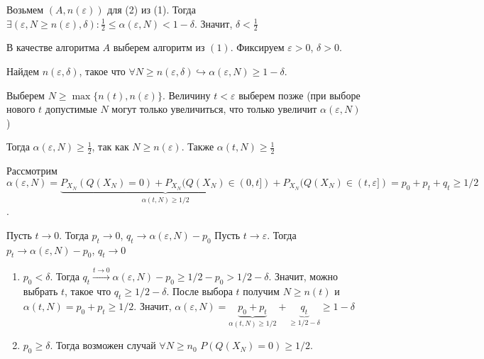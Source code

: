 \documentclass[a4paper]{article}
\def\eps{\varepsilon}
\begin{document}
\begin{enumerate}
Возьмем $(A,n(\eps))$ для (2) из (1). Тогда
$\exists(\eps,N\geqslant n(\eps),\delta)\colon \frac{1}{2}\leqslant\alpha(\eps, N)<1-\delta$. Значит, $\delta<\frac{1}{2}$

В качестве алгоритма $A$ выберем алгоритм из $(1)$. Фиксируем $\eps>0$, $\delta>0$.

Найдем $n(\eps,\delta)$, такое что $\forall N\geqslant n(\eps,\delta)\hookrightarrow\alpha(\eps, N)\geqslant 1-\delta$.

Выберем $N\geqslant \max\{n(t), n(\eps)\}$. Величину $t<\eps$ выберем позже (при выборе нового $t$ допустимые $N$ могут только увеличиться, что только увеличит $\alpha(\eps, N)$)

Тогда $\alpha(\eps, N)\geqslant\frac{1}{2}$, так как $N\geqslant n(\eps)$. Также $\alpha(t,N)\geqslant \frac{1}{2}$

Рассмотрим $\alpha(\eps, N)=\underbrace{P_{X_N}(Q(X_N)=0)+P_{X_N}(Q(X_N)\in(0,t])}_{\alpha(t,N)\geqslant1/2}+P_{X_N}(Q(X_N)\in(t,\eps])=p_0+p_t+q_t\geqslant 1/2$.

Пусть $t\to 0$. Тогда $p_t\to 0$, $q_t\to\alpha(\eps, N)-p_0$
Пусть $t\to\eps$. Тогда $p_t\to \alpha(\eps, N)-p_0$, $q_t\to 0$

\begin{enumerate}
\item $p_0<\delta$. Тогда $q_t\overset{t\to 0}{\longrightarrow}\alpha(\eps, N)-p_0\geqslant1/2-p_0>1/2-\delta$. Значит, можно выбрать $t$, такое что $q_t\geqslant 1/2-\delta$. После выбора $t$ получим $N\geqslant n(t)$ и $\alpha(t,N)=p_0+p_t\geqslant 1/2$. Значит, $\alpha(\eps, N)=\underbrace{p_0+p_t}_{\alpha(t,N)\geqslant 1/2}+\underbrace{q_t}_{\geqslant 1/2-\delta}\geqslant 1-\delta$
\item $p_0\geqslant\delta$. Тогда возможен случай $\forall N\geqslant n_0$ $P(Q(X_N)=0)\geqslant 1/2$. 
\end{enumerate}
\end{enumerate}
\end{document}

